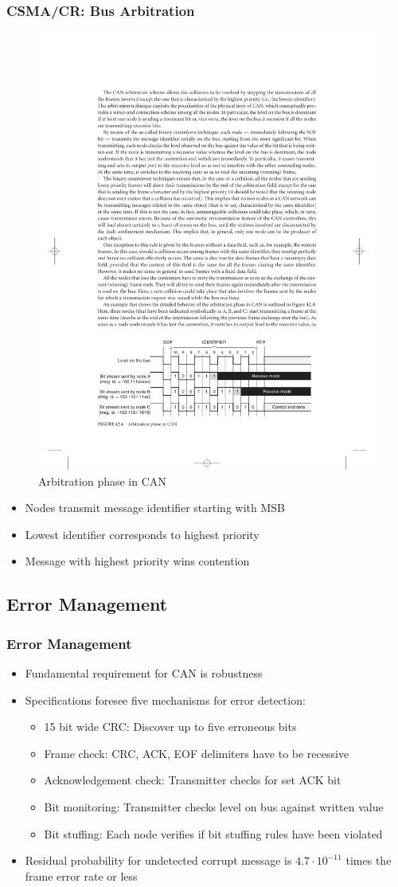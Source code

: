 \documentclass{beamer}
\begin{document}
\begin{frame}
	\frametitle{CSMA/CR: Bus Arbitration}
	\begin{figure}
		\includegraphics[width=.6\textwidth]{arbitration.pdf} 
		\caption{Arbitration phase in CAN}%
	\end{figure}
	
	\begin{itemize}
		\item Nodes transmit message identifier starting with MSB
		\item Lowest identifier corresponds to highest priority
		\item Message with highest priority wins contention
	\end{itemize}	
\end{frame}

\subsection{Error Management}
\begin{frame}
	\frametitle{Error Management}
	\begin{itemize}
		\item Fundamental requirement for CAN is robustness
		\item Specifications foresee five mechanisms for error detection:
		\begin{itemize}
			\item 15 bit wide CRC: Discover up to five erroneous bits
			\item Frame check: CRC, ACK, EOF delimiters have to be recessive
			\item Acknowledgement check: Transmitter checks for set ACK bit
			\item Bit monitoring: Transmitter checks level on bus against written value
			\item Bit stuffing: Each node verifies if bit stuffing rules have been violated
		\end{itemize}
		\item Residual probability for undetected corrupt message is $4.7 \cdot 10^{-11}$ times
			the frame error rate or less
	\end{itemize}	
\end{frame}
\end{document}
